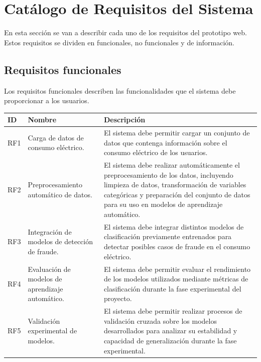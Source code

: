 \documentclass[12pt,a4paper]{report}
\begin{document}
\section{Catálogo de Requisitos del Sistema}

En esta sección se van a describir cada uno de los requisitos del prototipo web. Estos requisitos se dividen en funcionales, no funcionales y de información.

\subsection{Requisitos funcionales}

Los requisitos funcionales describen las funcionalidades que el sistema debe proporcionar a los usuarios.

\begin{table}[H]
\centering
\begin{tabular}{|p{2cm}|p{5cm}|p{7cm}|}
\hline
\textbf{ID} & \textbf{Nombre} & \textbf{Descripción} \\ \hline

RF1 & Carga de datos de consumo eléctrico. & El sistema debe permitir cargar un conjunto de datos que contenga información sobre el consumo eléctrico de los usuarios. \\ \hline

RF2 & Preprocesamiento automático de datos. & El sistema debe realizar automáticamente el preprocesamiento de los datos, incluyendo limpieza de datos, transformación de variables categóricas y preparación del conjunto de datos para su uso en modelos de aprendizaje automático. \\ \hline

RF3 & Integración de modelos de detección de fraude. & El sistema debe integrar distintos modelos de clasificación previamente entrenados para detectar posibles casos de fraude en el consumo eléctrico. \\ \hline

RF4 & Evaluación de modelos de aprendizaje automático. & El sistema debe permitir evaluar el rendimiento de los modelos utilizados mediante métricas de clasificación durante la fase experimental del proyecto. \\ \hline

RF5 & Validación experimental de modelos. & El sistema debe permitir realizar procesos de validación cruzada sobre los modelos desarrollados para analizar su estabilidad y capacidad de generalización durante la fase experimental. \\ \hline


\end{tabular}
\end{table}
\end{document}
